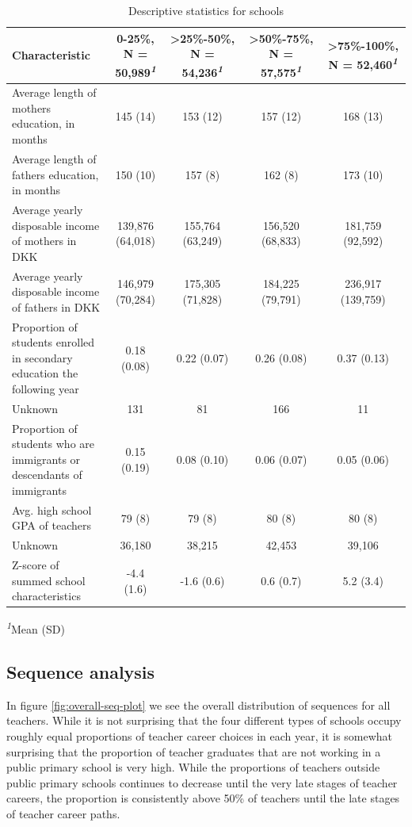 \documentclass[
]{article}
\begin{document}
\setlength{\LTpost}{0mm}
\begin{longtable}{lcccc}
\caption{Descriptive statistics for schools}
    \label{tab:des-schools}\\
\toprule
\textbf{Characteristic} & \textbf{0-25\%}, N = 50,989\textsuperscript{\textit{1}} & \textbf{\textgreater{}25\%-50\%}, N = 54,236\textsuperscript{\textit{1}} & \textbf{\textgreater{}50\%-75\%}, N = 57,575\textsuperscript{\textit{1}} & \textbf{\textgreater{}75\%-100\%}, N = 52,460\textsuperscript{\textit{1}} \\ 
\midrule\addlinespace[2.5pt]
Average length of mothers education, in months & 145 (14) & 153 (12) & 157 (12) & 168 (13) \\ 
Average length of fathers education, in months & 150 (10) & 157 (8) & 162 (8) & 173 (10) \\ 
Average yearly disposable income of mothers in DKK & 139,876 (64,018) & 155,764 (63,249) & 156,520 (68,833) & 181,759 (92,592) \\ 
Average yearly disposable income of fathers in DKK & 146,979 (70,284) & 175,305 (71,828) & 184,225 (79,791) & 236,917 (139,759) \\ 
Proportion of students enrolled in secondary education the following year & 0.18 (0.08) & 0.22 (0.07) & 0.26 (0.08) & 0.37 (0.13) \\ 
Unknown & 131 & 81 & 166 & 11 \\ 
Proportion of students who are immigrants or descendants of immigrants & 0.15 (0.19) & 0.08 (0.10) & 0.06 (0.07) & 0.05 (0.06) \\ 
Avg. high school GPA of teachers & 79 (8) & 79 (8) & 80 (8) & 80 (8) \\ 
Unknown & 36,180 & 38,215 & 42,453 & 39,106 \\ 
Z-score of summed school characteristics & -4.4 (1.6) & -1.6 (0.6) & 0.6 (0.7) & 5.2 (3.4) \\ 
\bottomrule
\end{longtable}
\begin{minipage}{\linewidth}
\textsuperscript{\textit{1}}Mean (SD)\\
\end{minipage}

\hypertarget{sequence-analysis-1}{%
\subsection{Sequence analysis}\label{sequence-analysis-1}}

In figure \ref{fig:overall-seq-plot} we see the overall distribution of sequences for all teachers. While it is not surprising that the four different types of schools occupy roughly equal proportions of teacher career choices in each year, it is somewhat surprising that the proportion of teacher graduates that are not working in a public primary school is very high. While the proportions of teachers outside public primary schools continues to decrease until the very late stages of teacher careers, the proportion is consistently above 50\% of teachers until the late stages of teacher career paths.
\end{document}
